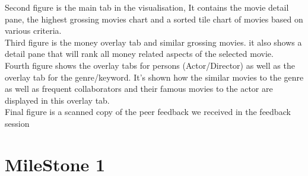 \documentclass{report}
\begin{document}
Second figure is the main tab in the visualisation, It contains the movie detail pane, the highest grossing movies chart and a sorted tile chart of movies based on various criteria.\\


Third figure is the money overlay tab and similar grossing movies. it also shows a detail pane that will rank all money related aspects of the selected movie.\\

Fourth figure shows the overlay tabs for persons (Actor/Director) as well as the overlay tab for the genre/keyword. It's shown how the similar movies to the genre as well as frequent collaborators and their famous movies to the actor are displayed in this overlay tab.\\

Final figure is a scanned copy of the peer feedback we received in the feedback session\\

\chapter{MileStone 1}
\label{chap-milestone1}
\end{document}
